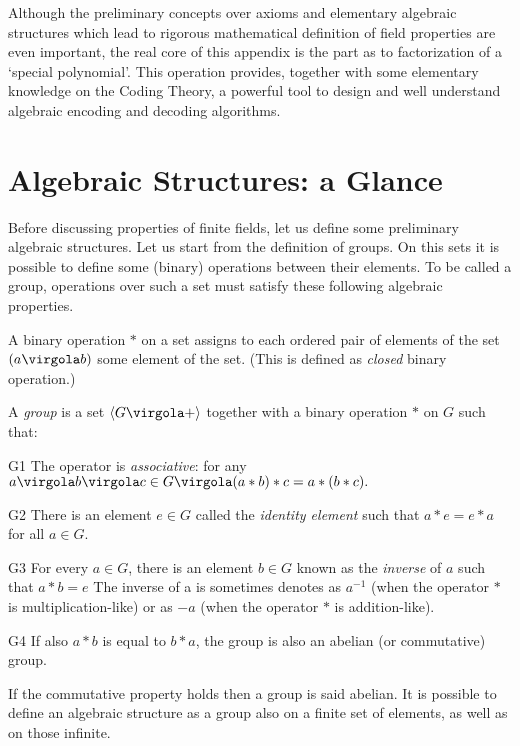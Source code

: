 Although the preliminary concepts over axioms and elementary algebraic structures which lead to rigorous mathematical definition of field properties are even important, the real core of this appendix is the part as to factorization of a `special polynomial'. This operation provides, together with some elementary knowledge on the Coding Theory, a powerful tool to design and well understand algebraic encoding and decoding algorithms.

\section{Algebraic Structures: a Glance} \label{sec:algebraicstruct}
Before discussing properties of finite fields, let us define some preliminary algebraic structures. Let us start from the definition of groups. On this sets it is possible to define some (binary) operations between their elements. To be called a group, operations over such a set must satisfy these following algebraic properties.

\begin{Def}
A binary operation \(\ast\) on a set assigns to each ordered pair of elements of the set $(a\virgola b)$ some element of the set. (This is defined as \emph{closed} binary operation.)
\end{Def}
\begin{Def}
A \emph{group} is a set $\langle G \virgola + \rangle$ together with a binary operation $\ast$ on $G$ such that:
\itemize
\item[G1] The operator is \emph{associative}: for any \(a \virgola b \virgola c \in G \virgola (a \ast b)\ast c= a \ast (b \ast c).\)
\item[G2] There is an element \(e \in G\) called the \emph{identity element} such that \( a\ast e = e \ast a \) for all \( a \in G\).
\item[G3] For every \( a \in G\), there is an element \(b \in G\) known as the \emph{inverse} of $a$ such that \(a \ast b = e\) The inverse of a is sometimes denotes as \(a^{-1}\) (when the operator $\ast$ is multiplication-like) or as $-a$ (when the operator $\ast$ is addition-like).
\item[G4] If also \( a \ast b  \) is equal to \(b \ast a\), the group is also an abelian (or commutative) group.
\end{Def}
If the commutative property holds then a group is said abelian. It is possible to define an algebraic structure as a group also on a finite set of elements, as well as on those infinite.

